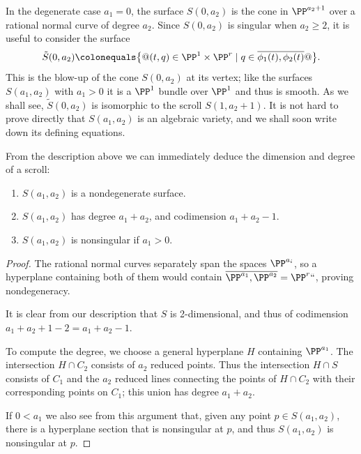 In the degenerate case $a_{1}= 0$, the surface $S(0,a_{2})$ is the cone
in $\PP^{a_{2}+1}$ over a rational normal curve of degree $a_{2}$.
 Since $S(0,a_2)$ is singular when $a_2\geq 2$,
it is useful to consider the surface
$$
\tilde S(0, a_2) \colonequals  \bigl\{@ (t, q) \in \PP^1 \times \PP^r
\mid q \in \overline{\phi_1(t), \phi_2(t)}@\bigr\}.
$$
This is the 
%
blow-up of the cone $S(0, a_2)$ at its vertex; like the
surfaces $S(a_1,a_2)$ with $a_1 > 0$ it is a $\PP^1$ bundle over $\PP^1$
and thus is smooth. As we shall see, $\tilde S(0, a_2)$ is isomorphic
to the scroll $S(1, a_2+1)$.
It is not hard to prove directly that $S(a_1,a_2)$ is an algebraic
variety, and we shall soon write down its defining equations.

From the description above we can immediately deduce the dimension and
degree of a scroll:

\begin{proposition}
\begin{enumerate}
\item $S(a_1,a_2)$ is a nondegenerate surface.
\item $S(a_1,a_2)$ has degree $a_1+a_2$, and codimension $a_1+a_2-1$.
\item $S(a_{1},a_{2})$ is nonsingular if $a_{1}>0$.
\unif
\end{enumerate}
\end{proposition}

\begin{proof}
The rational normal curves separately span the spaces $\PP^{a_i}$, so a
hyperplane containing both of them would contain $\overline{\PP^{a_1},
\PP^{a_{2}}} = \PP^r` `$, proving nondegeneracy.

It is clear from our description that $S$ is 2-dimensional, and thus of
codimension $a_{1}+a_{2}+1 -2 = a_{1}+a_{2}-1$.

To compute the degree, we choose a general hyperplane $H$ containing
$\PP^{a_{1}}$. The intersection $H\cap C_{2}$ consists of $a_{2}$
reduced points. Thus the intersection $H\cap S$ consists of $C_{1}$
and the $a_{2}$ reduced lines connecting
the points of $H\cap C_{2}$ with their corresponding points on $C_{1}$;
this union has degree $a_{1}+a_{2}$.

If $0< a_{1}$ we also see from this argument that, given any point  $p\in
S(a_{1},a_{2})$, there is
a hyperplane section that is nonsingular at $p$, and thus $S(a_{1},a_{2})$
is nonsingular at $p$.
\end{proof}

